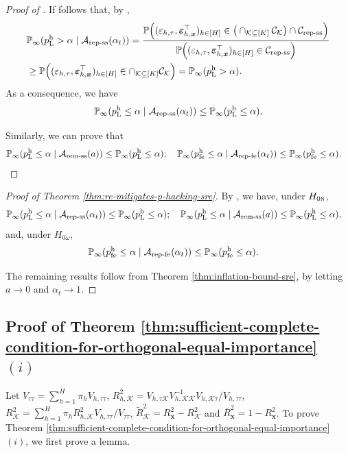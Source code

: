 \documentclass[12pt]{article}
\newcommand{\hpfe}{p_\textnormal{fe}^{\textnormal{h}}}
\newcommand{\Prob}{\mathbb{P}}
\newcommand{\mk}{\mathcal{K}}
\newcommand{\ma}{\mathcal{A}}
\newcommand{\remss}{\textnormal{rem-ss}}
\newcommand{\repss}{\textnormal{rep-ss}}
\newcommand{\repfe}{\textnormal{rep-fe}}
\newcommand{\bs}{\boldsymbol}
\newcommand{\hpL}{p_\textnormal{L}^{\textnormal{h}}}
\begin{document}
\begin{proof}[Proof of ]
    If follows that, by ,
    \begin{align*}
        &\Prob_{\infty}(\hpL > \alpha\mid \ma_{\repss}(\alpha_t)) = \frac{\Prob \Big((\varepsilon_{h,\tau},\bs{\varepsilon}_{h,\bs{x}}^\top)_{h\in [H]}  \in \big(\cap_{\mk \subseteq [K]}\mathcal{C}_{\mk}\big) \cap \mathcal{C}_{\repss} \Big)}{\Prob \Big((\varepsilon_{h,\tau},\bs{\varepsilon}_{h,\bs{x}}^\top)_{h\in [H]}  \in \mathcal{C}_{\repss} \Big)}\\
        &\geq \Prob \Big((\varepsilon_{h,\tau},\bs{\varepsilon}_{h,\bs{x}}^\top)_{h\in [H]}  \in  \cap_{\mk \subseteq [K]}\mathcal{C}_{\mk} \Big) =  \Prob_{\infty}(\hpL > \alpha).
    \end{align*}
    As a consequence, we have
    \[
    \Prob_{\infty}(\hpL \leq \alpha\mid \ma_{\repss}(\alpha_t)) \leq \Prob_{\infty}(\hpL \leq \alpha).
    \]

    Similarly, we can prove that
    \begin{align*}
     &\Prob_{\infty}(\hpL \leq \alpha\mid \ma_{\remss}(a)) \leq \Prob_{\infty}(\hpL \leq \alpha);\quad \Prob_{\infty}(\hpfe \leq \alpha\mid \ma_{\repfe}(\alpha_t)) \leq \Prob_{\infty}(\hpfe \leq \alpha).
    \end{align*}
\end{proof}

\begin{proof}[Proof of Theorem \ref{thm:re-mitigates-p-hacking-sre}]
    By , 
we have, under $H_{0\textsc{n}}$, 
   \begin{align*}
        &\Prob_{\infty}(\hpL \leq \alpha\mid \ma_{\repss}(\alpha_t)) \leq \Prob_{\infty}(\hpL \leq \alpha); \quad \Prob_{\infty}(\hpL \leq \alpha\mid \ma_{\remss}(a)) \leq \Prob_{\infty}(\hpL \leq \alpha),
    \end{align*}
and, under $H_{0\omega}$,
 \begin{align*}
            &\Prob_{\infty}(\hpfe \leq \alpha\mid \ma_{\repfe}(\alpha_t)) \leq \Prob_{\infty}(\hpfe \leq \alpha).
 \end{align*}

The remaining results follow from Theorem \ref{thm:inflation-bound-sre}, by letting $a\rightarrow 0$ and $\alpha_t\rightarrow 1$. 
\end{proof}

\subsection{Proof of Theorem \ref{thm:sufficient-complete-condition-for-orthogonal-equal-importance} $(i)$}
Let $V_{\tau\tau} = \sum_{h=1}^H \pi_{ h }  V_{ h,\tau\tau}$, $R^2_{h,\mk} = V_{h,\tau \mk} V_{h,\mk \mk}^{-1} V_{h, \mk \tau}/V_{h, \tau\tau}$, $R^2_{\mk} = \sum_{h=1}^H \pi_{ h } {R}^2_{ h, \mk} V_{ h,\tau\tau} /V_{\tau\tau}$, $\tilde{R}_{\mk}^2 = 
R^2_{\bs{x}} - R^2_{\mk}$ and $\bar{R}_{\bs{x}}^2 = 1-R_{\bs{x}}^2$. To prove Theorem \ref{thm:sufficient-complete-condition-for-orthogonal-equal-importance} $(i)$, we first prove a lemma.
 
\end{document}
